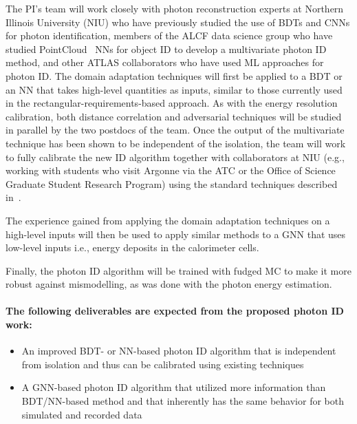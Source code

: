 \documentclass[letter, USenglish, 11pt, subfigure]{article}
\begin{document}
The PI's team will work closely with photon reconstruction experts at Northern Illinois University (NIU) who have previously studied the use of BDTs and CNNs for photon identification, members of the ALCF data science group who have studied PointCloud~\cite{ATL-PHYS-PUB-2021-002} NNs for object ID to develop a multivariate photon ID method, and other ATLAS collaborators who have used ML approaches for photon ID. The domain adaptation techniques will first be applied to a BDT or an NN that takes high-level quantities as inputs, similar to those currently used in the rectangular-requirements-based approach. As with the energy resolution calibration, both distance correlation and adversarial techniques will be studied in parallel by the two postdocs of the team. Once the output of the multivariate technique has been shown to be independent of the isolation, the team will work to fully calibrate the new ID algorithm together with collaborators at NIU (e.g., working with students who visit Argonne via the ATC or the Office of Science Graduate Student Research Program) using the standard techniques described in~\cite{PERF-2013-04,PERF-2017-02}.

The experience gained from applying the domain adaptation techniques on a high-level inputs will then be used to apply similar methods to a GNN that uses low-level inputs i.e., energy deposits in the calorimeter cells.

Finally, the photon ID algorithm will be trained with fudged MC to make it more robust against mismodelling, as was done with the photon energy estimation. 

\paragraph{The following deliverables are expected from the proposed photon ID work:}
\begin{itemize}
\item An improved BDT- or NN-based photon ID algorithm that is independent from isolation and thus can be calibrated using existing techniques
\item A GNN-based photon ID algorithm that utilized more information than BDT/NN-based method and that inherently has the same behavior for both simulated and recorded data
\end{itemize}
\end{document}
